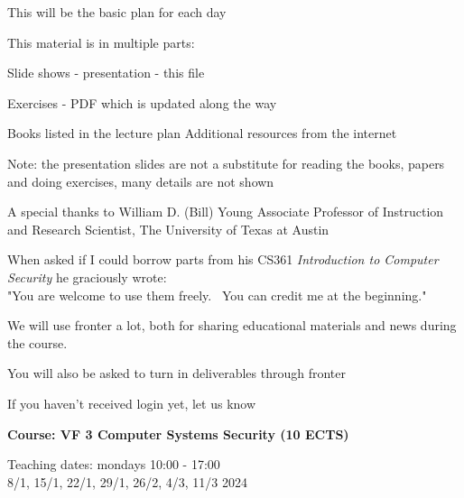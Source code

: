 \documentclass[Screen16to9,17pt]{foils}
\begin{document}
\vskip 5mm
\centerline{This will be the basic plan for each day}


\begin{list1}
\item This material is in multiple parts:
\begin{list2}
\item Slide shows - presentation - this file
\item Exercises - PDF which is updated along the way
\end{list2}
\item Books listed in the lecture plan Additional resources from the internet
\end{list1}

Note: the presentation slides are not a substitute for reading the books, papers and doing exercises, many details are not shown

A special thanks to William D. (Bill) Young
Associate Professor of Instruction and Research Scientist,
The University of Texas at Austin

When asked if I could borrow parts from his CS361 \emph{Introduction to Computer Security} he graciously wrote:\\
"You are welcome to use them freely.  You can credit me at the beginning." 




We will use fronter a lot, both for sharing educational materials and news during the course.

You will also be asked to turn in deliverables through fronter


\vskip 5mm
\centerline{If you haven't received login yet, let us know}





{\Large\bf Course: VF 3  Computer Systems Security (10 ECTS)}

Teaching dates: mondays 10:00 - 17:00\\
8/1, 15/1, 22/1, 29/1, 26/2, 4/3, 11/3  2024
\end{document}
